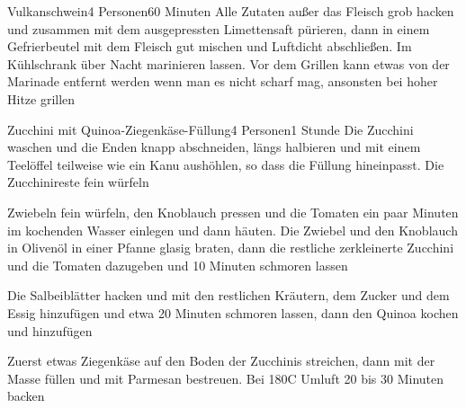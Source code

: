
\begin{recipe}{Vulkanschwein}{4 Personen}{60 Minuten}
Alle Zutaten außer das Fleisch grob hacken und zusammen mit dem ausgepressten Limettensaft pürieren, dann in einem Gefrierbeutel mit dem Fleisch gut mischen und Luftdicht abschließen.
Im Kühlschrank über Nacht marinieren lassen.
Vor dem Grillen kann etwas von der Marinade entfernt werden wenn man es nicht scharf mag, ansonsten bei hoher Hitze grillen
\end{recipe}


\begin{recipe}{Zucchini mit Quinoa-Ziegenkäse-Füllung}{4 Personen}{1 Stunde}
Die Zucchini waschen und die Enden knapp abschneiden, längs halbieren und mit einem Teelöffel teilweise wie ein Kanu aushöhlen, so dass die Füllung hineinpasst. 
Die Zucchinireste fein würfeln

Zwiebeln fein würfeln, den Knoblauch pressen und die Tomaten ein paar Minuten im kochenden Wasser einlegen und dann häuten.
Die Zwiebel und den Knoblauch in Olivenöl in einer Pfanne glasig braten, dann die restliche zerkleinerte Zucchini und die Tomaten dazugeben und 10 Minuten schmoren lassen

Die Salbeiblätter hacken und mit den restlichen Kräutern, dem Zucker und dem Essig hinzufügen und etwa 20 Minuten schmoren lassen, dann den Quinoa kochen und hinzufügen

Zuerst etwas Ziegenkäse auf den Boden der Zucchinis streichen, dann mit der Masse füllen und mit Parmesan bestreuen.
Bei 180\0C Umluft 20 bis 30 Minuten backen
\end{recipe}

